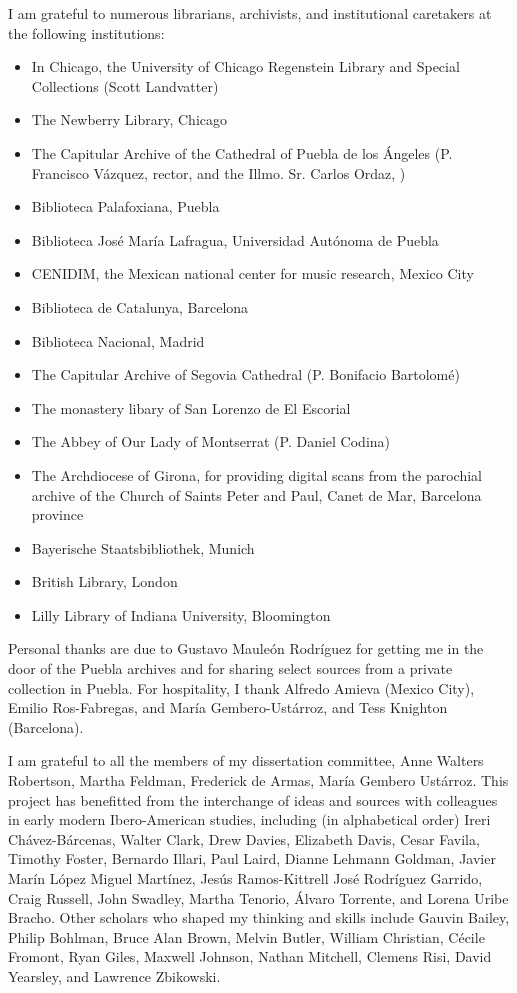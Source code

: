 I am grateful to numerous librarians, archivists, and institutional
caretakers at the following institutions:
\begin{itemize}
    \item In Chicago, the University of Chicago Regenstein Library and Special
        Collections (Scott Landvatter)
    \item The Newberry Library, Chicago
    \item The Capitular Archive of the Cathedral of Puebla de los Ángeles
        (P. Francisco Vázquez, rector, and the Illmo. Sr. Carlos
        Ordaz, )
    \item Biblioteca Palafoxiana, Puebla
    \item Biblioteca José María Lafragua, Universidad Autónoma de Puebla
    \item CENIDIM, the Mexican national center for music research, Mexico
        City
    \item Biblioteca de Catalunya, Barcelona
    \item Biblioteca Nacional, Madrid
    \item The Capitular Archive of Segovia Cathedral (P. Bonifacio Bartolomé)
    \item The monastery libary of San Lorenzo de El Escorial
    \item The Abbey of Our Lady of Montserrat (P. Daniel Codina)
    \item The Archdiocese of Girona, for providing digital scans from the
        parochial archive of the Church of Saints Peter and Paul, Canet de
        Mar, Barcelona province
    \item Bayerische Staatsbibliothek, Munich
    \item British Library, London
    \item Lilly Library of Indiana University, Bloomington
\end{itemize}

Personal thanks are due to Gustavo Mauleón Rodríguez for getting me in the
door of the Puebla archives and for sharing select sources from a private
collection in Puebla.
For hospitality, I thank Alfredo Amieva (Mexico City), Emilio Ros-Fabregas,
and María Gembero-Ustárroz, and Tess Knighton (Barcelona).

I am grateful to all the members of my dissertation committee, Anne Walters
Robertson, Martha Feldman, Frederick de Armas, María Gembero Ustárroz.
This project has benefitted from the interchange of ideas and sources with
colleagues in early modern Ibero-American studies, including (in alphabetical
order)
Ireri Chávez-Bárcenas,
Walter Clark,
Drew Davies,
Elizabeth Davis,
Cesar Favila,
Timothy Foster,
Bernardo Illari,
Paul Laird,
Dianne Lehmann Goldman,
Javier Marín López
Miguel Martínez, 
Jesús Ramos-Kittrell
José Rodríguez Garrido, 
Craig Russell,
John Swadley,
Martha Tenorio, 
Álvaro Torrente,
and 
Lorena Uribe Bracho.
Other scholars who shaped my thinking and skills include 
Gauvin Bailey, 
Philip Bohlman, 
Bruce Alan Brown,
Melvin Butler, 
William Christian, 
Cécile Fromont, 
Ryan Giles, 
Maxwell Johnson, 
Nathan Mitchell,
Clemens Risi,
David Yearsley, 
and
Lawrence Zbikowski.

